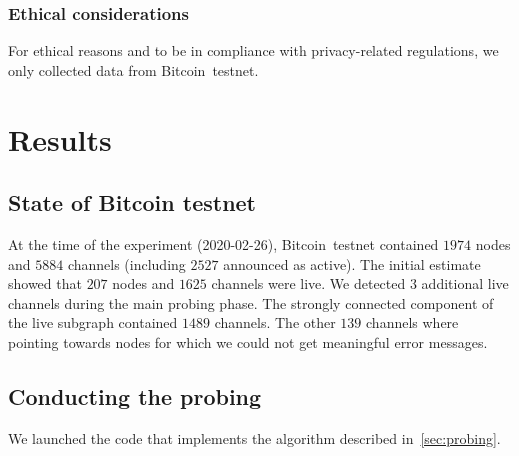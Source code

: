 \subsubsection*{Ethical considerations}
For ethical reasons and to be in compliance with privacy-related regulations, we only collected data from Bitcoin~testnet.



\section{Results} \label{sec:results}
\subsection{State of Bitcoin testnet}

At the time of the experiment (2020-02-26), Bitcoin~testnet contained $1974$ nodes and $5884$ channels (including $2527$ announced as active).
The initial estimate showed that $207$ nodes and $1625$ channels were live.
We detected $3$ additional live channels during the main probing phase.
The strongly connected component of the live subgraph contained $1489$ channels.
The other $139$ channels where pointing towards nodes for which we could not get meaningful error messages.



\subsection{Conducting the probing}

We launched the code that implements the algorithm described in~\cref{sec:probing}.

